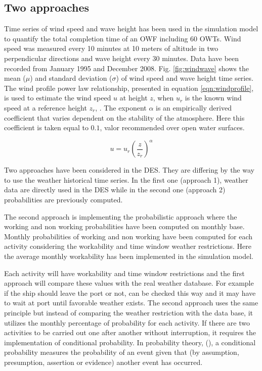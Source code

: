 \subsection{Two approaches}
Time series of wind speed and wave height has been used in the simulation model to quantify the total completion time of an OWF including 60 OWTs. Wind speed was measured every 10 minutes at 10 meters of altitude in two perpendicular directions and wave height every 30 minutes. Data have been recorded from January 1995 and December 2008.
Fig. \ref{fig:windwave} shows the mean ($\mu$) and standard deviation ($\sigma$) of wind speed and wave height time series.
The wind profile power law relationship, presented in equation \ref{eqn:windprofile}, is used to estimate the wind speed $u$ at height $z$, when $u_{r}$ is the known wind speed at a reference height $z_{r}$, \cite{1978Peterson}. The exponent $\alpha$ is an empirically derived coefficient that varies dependent on the stability of the atmosphere. Here this coefficient is taken equal to $0.1$, valor recommended over open water surfaces.

\begin{equation}
\label{eqn:windprofile}
u = u_{r} \left( \frac{z}{z_r} \right)^{\alpha}
\end{equation}

Two approaches have been considered in the DES. They are differing by the way to use the weather historical time series. In the first one (approach 1), weather data are directly used in the DES while in the second one (approach 2) probabilities are previously computed.


The second approach is implementing the probabilistic approach where the working and non working probabilities have been computed on monthly base. Monthly probabilities of working and non working have been computed for each activity considering the workability and time window weather restrictions. Here the average monthly workability has been implemented in the simulation model. 

Each activity will have workability and time window restrictions and the first approach will compare these values with the real weather database. For example if the ship should leave the port or not, can be checked this way and it may have to wait at port until favorable weather exists. The second approach uses the same principle but instead of comparing the weather restriction with the data base, it utilizes the monthly percentage of probability for each activity. If there are two activities to be carried out one after another without interruption, it requires the implementation of conditional probability.  
In probability theory, (\cite{Thalemann2012}), a conditional probability measures the probability of an event given that (by assumption, presumption, assertion or evidence) another event has occurred. 

